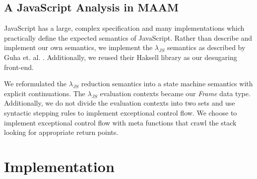 \documentclass[10pt,letter,english]{article}
\newcommand{\js}[0]{JavaScript}
\newcommand{\lambdajs}[0]{$\lambda_{JS}$}
\begin{document}
\subsection{A JavaScript Analysis in MAAM}

\js{} has a large, complex specification and many implementations which
practically define the expected semantics of \js{}. Rather than describe and
implement our own semantics, we implement the \lambdajs{} semantics as described
by Guha et. al. \cite{lambdajs}. Additionally, we reused their Haksell library
as our desugaring front-end.

% 

We reformulated the \lambdajs{} reduction semantics into a state machine
semantics with explicit continuations. The \lambdajs{} evaluation contexts
became our \emph{Frame} data type. Additionally, we do not divide the
evaluation contexts into two sets and use syntactic stepping rules to implement
exceptional control flow. We choose to implement exceptional control flow with
meta functions that crawl the stack looking for appropriate return points.

\section{Implementation}
\end{document}
